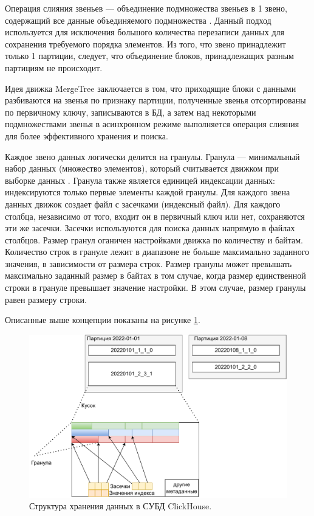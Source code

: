 Операция слияния звеньев --- объединение подмножества звеньев в 1 звено, содержащий все данные объединяемого подмножества \cite{mergetreearch}. Данный подход используется для исключения большого количества перезаписи данных для сохранения требуемого порядка элементов. Из того, что звено принадлежит только 1 партиции, следует, что объединение блоков, принадлежащих разным партициям не происходит.

Идея движка MergeTree заключается в том, что приходящие блоки с данными разбиваются на звенья по признаку партиции, полученные звенья отсортированы по первичному ключу, записываются в БД, а затем над некоторыми подмножествами звенья в асинхронном режиме выполняется операция слияния для более эффективного хранения и поиска.

Каждое звено данных логически делится на гранулы. Гранула --- минимальный набор данных (множество элементов), который считывается движком при выборке данных \cite{mergetreearch}. Гранула также является единицей индексации данных: индексируются только первые элементы каждой гранулы. Для каждого звена данных движок создает файл с засечками (индексный файл). Для каждого столбца, независимо от того, входит он в первичный ключ или нет, сохраняются эти же засечки. Засечки используются для поиска данных напрямую в файлах столбцов. Размер гранул оганичен настройками движка по количеству и байтам. Количество строк в грануле лежит в диапазоне не больше максимально заданного значения, в зависимости от размера строк. Размер гранулы может превышать максимально заданный размер в байтах в том случае, когда размер единственной строки в грануле превышает значение настройки. В этом случае, размер гранулы равен размеру строки.

Описанные выше концепции показаны на рисунке \ref{fig:clickhousebase}.

\begin{figure}[hbtp]
	\centering
	\includegraphics[width=\textwidth]{img/clickhousebase.pdf}
	\caption{Структура хранения данных в СУБД ClickHouse.}
	\label{fig:clickhousebase}
\end{figure}


